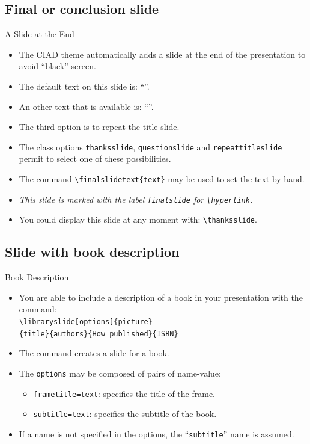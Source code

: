 \documentclass[english,sectioncirclenumberstyle]{ciadbeamer}
\begin{document}
\subsection{Final or conclusion slide}
\subsectiontableofcontentslide

\begin{frame}{{A Slide} at the End}
	\begin{itemize}
	\item The CIAD theme automatically adds a slide at the end of the presentation to avoid ``black'' screen.
	\vfill
	\item The default text on this slide is: ``''.
	\item An other text that is available is: ``''.
	\item The third option is to repeat the title slide.
	\vfill
	\item The class options \texttt{thanksslide}, \texttt{questionslide} and \texttt{repeattitleslide} permit to select one of these possibilities.
	\vfill
	\item The command \texttt{{\textbackslash}finalslidetext\{text\}} may be used to set the text by hand.
	\vfill
	\item \emph{This slide is marked with the label \texttt{finalslide} for \texttt{{\textbackslash}hyperlink}.}
	\vfill
	\item You could display this slide at any moment with: \texttt{{\textbackslash}thanksslide}.
	\end{itemize}
\end{frame}

\subsection{Slide with book description}
\subsectiontableofcontentslide

\begin{frame}{Book Description}
	\begin{itemize}
	\item You are able to include a description of a book in your presentation with the command: \\
		\texttt{{\textbackslash}libraryslide[options]\{picture\}} \\
		\texttt{\{title\}\{authors\}\{How published\}\{ISBN\}}
	\vspace{1em}
	\item The command creates a slide for a book.
	\vspace{1em}
	\item The \texttt{options} may be composed of pairs of name-value:
		\begin{itemize}
		\item \texttt{frametitle=text}: specifies the title of the frame.
		\item \texttt{subtitle=text}: specifies the subtitle of the book.
		\end{itemize}
	\item If a name is not specified in the options, the ``\texttt{subtitle}'' name is assumed.
	\end{itemize}
\end{frame}
\end{document}
